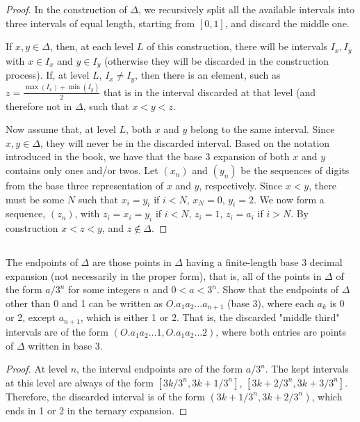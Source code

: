 \begin{proof}
In the construction of $\Delta$, we recursively split all the available intervals into three intervals of equal length, starting from $[0,1]$, and discard the middle one.

If $x,y \in \Delta$, then, at each level $L$ of this construction, there will be intervals $I_x, I_y$ with $x\in I_x$ and $y \in I_y$ (otherwise they will be discarded in the construction process). If, at level $L$, $I_x \neq I_y$, then there is an element, such as $z=\frac{\max(I_x) + \min(I_y)}{2}$ that is in the interval discarded at that level (and therefore not in $\Delta$, such that $x < y < z$.

Now assume that, at level $L$, both $x$ and $y$ belong to the same interval. Since $x,y\in\Delta$, they will never be in the discarded interval. Based on the notation introduced in the book, we have that the base 3 expansion of both $x$ and $y$ contains only ones and/or twos. Let $(x_n)$ and $(y_n)$ be the sequences of digits from the base three representation of $x$ and $y$, respectively. Since $x < y$, there must be some $N$ such that $x_i = y_i$ if $i < N$, $x_N = 0$, $y_i = 2$. We now form a sequence, $(z_n)$, with $z_i = x_i = y_i$ if $i < N$, $z_i = 1$, $z_i = a_i$ if $i > N$. By construction $x < z < y$, and $z \notin \Delta$.

\end{proof}


\subsection{} The endpoints of $\Delta$ are those points in $\Delta$ having a   finite-length base 3 decimal expansion (not necessarily in the proper form), that is, all of the points in $\Delta$ of the form $a/3^n$ for some integers $n$ and $0 < a < 3^n$. Show that the endpoints of $\Delta$ other than 0 and 1 can be written as $O.a_1a_2\dots a_{n+1}$ (base 3), where each $a_k$ is 0 or 2, except $a_{n+1}$, which is either 1 or 2. That is, the discarded "middle third" intervals are of the form $(O.a_1a_2\dots 1, O.a_1a_2\dots2)$, where both entries are points of $\Delta$ written in base 3.

\begin{proof}
At level $n$, the interval endpoints are of the form $a/3^n$. The kept intervals at this level are always of the form $[3k/3^n, 3k+1/3^n]$, $[3k+2/3^n, 3k+3/3^n]$. Therefore, the discarded interval is of the form $(3k+1/3^n, 3k+2/3^n)$, which ends in 1 or 2 in the ternary expansion.
\end{proof}

